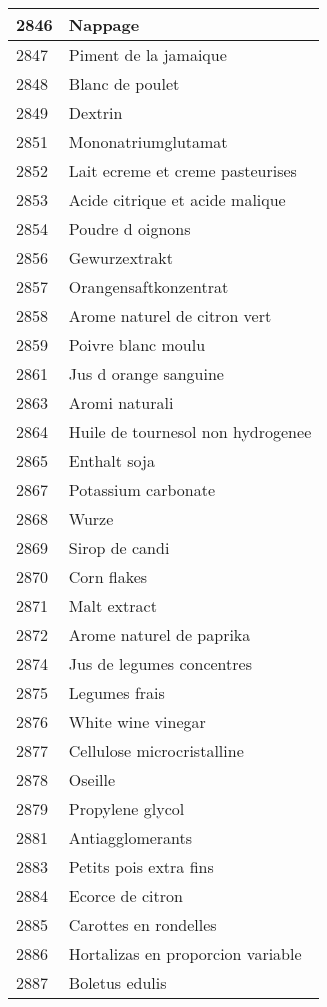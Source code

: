 \begin{longtable}{|l|l|}
2846 & Nappage \\ \hline 
2847 & Piment de la jamaique \\ \hline 
2848 & Blanc de poulet \\ \hline 
2849 & Dextrin \\ \hline 
2851 & Mononatriumglutamat \\ \hline 
2852 & Lait ecreme et creme pasteurises \\ \hline 
2853 & Acide citrique et acide malique \\ \hline 
2854 & Poudre d oignons \\ \hline 
2856 & Gewurzextrakt \\ \hline 
2857 & Orangensaftkonzentrat \\ \hline 
2858 & Arome naturel de citron vert \\ \hline 
2859 & Poivre blanc moulu \\ \hline 
2861 & Jus d orange sanguine \\ \hline 
2863 & Aromi naturali \\ \hline 
2864 & Huile de tournesol non hydrogenee \\ \hline 
2865 & Enthalt soja \\ \hline 
2867 & Potassium carbonate \\ \hline 
2868 & Wurze \\ \hline 
2869 & Sirop de candi \\ \hline 
2870 & Corn flakes \\ \hline 
2871 & Malt extract \\ \hline 
2872 & Arome naturel de paprika \\ \hline 
2874 & Jus de legumes concentres \\ \hline 
2875 & Legumes frais \\ \hline 
2876 & White wine vinegar \\ \hline 
2877 & Cellulose microcristalline \\ \hline 
2878 & Oseille \\ \hline 
2879 & Propylene glycol \\ \hline 
2881 & Antiagglomerants \\ \hline 
2883 & Petits pois extra fins \\ \hline 
2884 & Ecorce de citron \\ \hline 
2885 & Carottes en rondelles \\ \hline 
2886 & Hortalizas en proporcion variable \\ \hline 
2887 & Boletus edulis \\ \hline 

\end{longtable}
